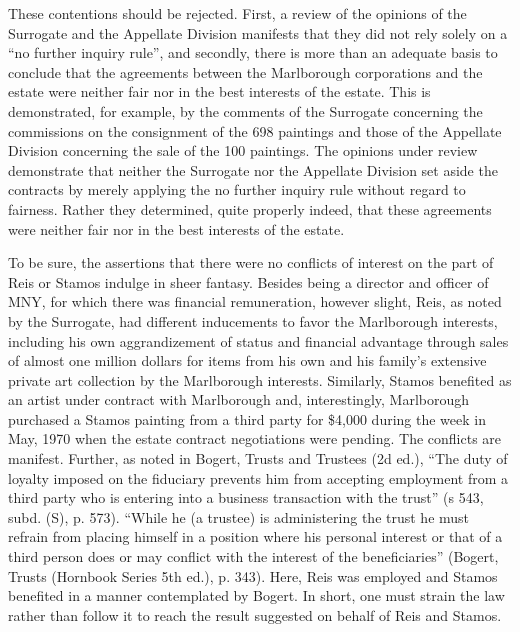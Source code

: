 These contentions should be rejected. First, a review of the opinions of the
Surrogate and the Appellate Division manifests that they did not rely solely on
a ``no further inquiry rule'', and secondly, there is more than an adequate
basis to conclude that the agreements between the Marlborough corporations and
the estate were neither fair nor in the best interests of the estate. This is
demonstrated, for example, by the comments of the Surrogate concerning the
commissions on the consignment of the 698 paintings and those of the Appellate
Division concerning the sale of the 100 paintings. The opinions under review
demonstrate that neither the Surrogate nor the Appellate Division set aside the
contracts by merely applying the no further inquiry rule without regard to
fairness. Rather they determined, quite properly indeed, that these agreements
were neither fair nor in the best interests of the estate.

To be sure, the assertions that there were no conflicts of interest on the part
of Reis or Stamos indulge in sheer fantasy. Besides being a director and officer
of MNY, for which there was financial remuneration, however slight, Reis, as
noted by the Surrogate, had different inducements to favor the Marlborough
interests, including his own aggrandizement of status and financial advantage
through sales of almost one million dollars for items from his own and his
family's extensive private art collection by the Marlborough interests.
Similarly, Stamos benefited as an artist under contract with Marlborough and,
interestingly, Marlborough purchased a Stamos painting from a third party for
\$4,000 during the week in May, 1970 when the estate contract negotiations were
pending. The conflicts are manifest. Further, as noted in Bogert, Trusts and
Trustees (2d ed.), ``The duty of loyalty imposed on the fiduciary prevents him
from accepting employment from a third party who is entering into a business
transaction with the trust'' (s 543, subd. (S), p. 573). ``While he (a trustee)
is administering the trust he must refrain from placing himself in a position
where his personal interest or that of a third person does or may conflict with
the interest of the beneficiaries'' (Bogert, Trusts (Hornbook Series 5th ed.),
p. 343). Here, Reis was employed and Stamos benefited in a manner contemplated
by Bogert. In short, one must strain the law rather than follow it to reach the
result suggested on behalf of Reis and Stamos.

